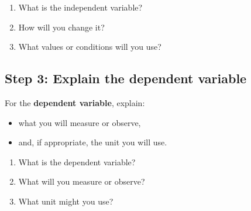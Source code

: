 \documentclass[12pt]{article}
\begin{document}
\begin{enumerate}[leftmargin=1.7em]
    \item What is the independent variable?
    
    \vspace{1.2cm}
    
    \item How will you change it?
    
    \vspace{1.5cm}
    
    \item What values or conditions will you use?
    
    \vspace{1.5cm}
\end{enumerate}


\subsection*{Step 3: Explain the dependent variable}

\begin{tcolorbox}[colback=white,colframe=black,title=What to include]
For the \textbf{dependent variable}, explain:
\begin{itemize}[leftmargin=1.5em]
    \item what you will measure or observe,
    \item and, if appropriate, the unit you will use.
\end{itemize}
\end{tcolorbox}

\begin{enumerate}[leftmargin=1.7em]
    \item What is the dependent variable?
    
    \vspace{1.2cm}
    
    \item What will you measure or observe?
    
    \vspace{1.5cm}
    
    \item What unit might you use?
    
    \vspace{1.5cm}
\end{enumerate}

\vspace{1em}
\end{document}
